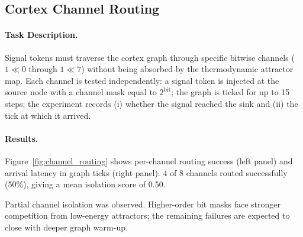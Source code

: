 \subsection{Cortex Channel Routing}
\label{sec:channel_routing}

\paragraph{Task Description.}
Signal tokens must traverse the cortex graph through specific bitwise channels
($1\!\ll\!0$ through $1\!\ll\!7$) without being absorbed by the thermodynamic
attractor map. Each channel is tested independently: a signal token is injected
at the source node with a channel mask equal to $2^{\text{bit}}$; the graph is
ticked for up to 15 steps; the experiment records (i) whether the signal reached
the sink and (ii) the tick at which it arrived.

\paragraph{Results.}
Figure~\ref{fig:channel_routing} shows per-channel routing success (left panel)
and arrival latency in graph ticks (right panel). 4 of 8 channels
routed successfully (50\%), giving a mean isolation score of
0.50.

Partial channel isolation was observed. Higher-order bit masks face stronger
competition from low-energy attractors; the remaining failures are expected to
close with deeper graph warm-up.

